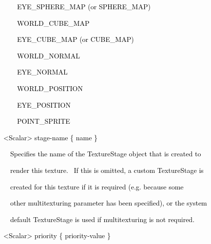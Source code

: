 \documentclass[a4paper]{article}
\newcommand\textstyleOOoComputerKeyWord[1]{\textrm{\textcolor[rgb]{0.0,0.0,0.5019608}{#1}}}
\begin{document}
\bigskip

{\color{black}
\textstyleOOoComputerKeyWord{\textcolor{black}{\ \ \ \ \ \ EYE\_SPHERE\_MAP (or SPHERE\_MAP)}}}

{\color{black}
\textstyleOOoComputerKeyWord{\textcolor{black}{\ \ \ \ \ \ WORLD\_CUBE\_MAP}}}

{\color{black}
\textstyleOOoComputerKeyWord{\textcolor{black}{\ \ \ \ \ \ EYE\_CUBE\_MAP (or CUBE\_MAP)}}}

{\color{black}
\textstyleOOoComputerKeyWord{\textcolor{black}{\ \ \ \ \ \ WORLD\_NORMAL}}}

{\color{black}
\textstyleOOoComputerKeyWord{\textcolor{black}{\ \ \ \ \ \ EYE\_NORMAL}}}

{\color{black}
\textstyleOOoComputerKeyWord{\textcolor{black}{\ \ \ \ \ \ WORLD\_POSITION}}}

{\color{black}
\textstyleOOoComputerKeyWord{\textcolor{black}{\ \ \ \ \ \ EYE\_POSITION}}}

{\color{black}
\textstyleOOoComputerKeyWord{\textcolor{black}{\ \ \ \ \ \ POINT\_SPRITE}}}


\bigskip

{\color{black}
\textstyleOOoComputerKeyWord{\textcolor{black}{\ \ {\textless}Scalar{\textgreater} stage-name \{ name \}}}}


\bigskip

{\color{black}
\textstyleOOoComputerKeyWord{\textcolor{black}{\ \ \ \ Specifies the name of the TextureStage object that is created
to}}}

{\color{black}
\textstyleOOoComputerKeyWord{\textcolor{black}{\ \ \ \ render this texture. \ If this is omitted, a custom TextureStage
is}}}

{\color{black}
\textstyleOOoComputerKeyWord{\textcolor{black}{\ \ \ \ created for this texture if it is required (e.g. because some}}}

{\color{black}
\textstyleOOoComputerKeyWord{\textcolor{black}{\ \ \ \ other multitexturing parameter has been specified), or the
system}}}

\clearpage
\bigskip

{\color{black}
\textstyleOOoComputerKeyWord{\textcolor{black}{\ \ \ \ default TextureStage is used if multitexturing is not
required.}}}


\bigskip

{\color{black}
\textstyleOOoComputerKeyWord{\textcolor{black}{\ \ {\textless}Scalar{\textgreater} priority \{ priority-value \}}}}


\bigskip
\end{document}
